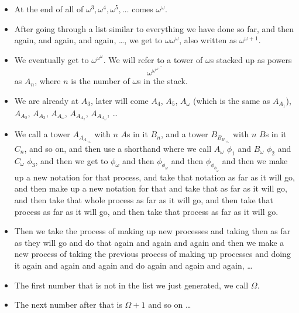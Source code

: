 \begin{itemize}
\item
At the end of all of $\omega^3, \omega^4, \omega^5, \ldots$ comes $\omega^{\omega}$.
\item
After going through a list similar to everything we have done so far, and then again, and again, and again, \ldots, we get to $\omega \omega^{\omega}$, also written as $\omega^{\omega + 1}$.
\item
We eventually get to $\omega^{\omega^\omega}$. We will refer to a tower of $\omega$s stacked up as powers 
\[ \omega^{\omega^{\omega^{\ldots^{\omega}}}} \]
as $A_n$, where $n$ is the number of $\omega$s in the stack.
\item
We are already at $A_3$, later will come $A_4$, $A_5$, $A_{\omega}$ (which is the same as $A_{A_1}$), $A_{A_2}$, $A_{A_3}$, $A_{A_\omega}$, $A_{A_{A_2}}$, $A_{A_{A_\omega}}$, \ldots
\item
We call a tower $A_{A_{A_{\ddots_{A_\omega}}}}$ with $n$ $A$s in it $B_n$, and a tower $B_{B_{B_{\ddots_{B_\omega}}}}$ with $n$ $B$s in it $C_n$, and so on, and then use a shorthand where we call $A_\omega$ $\phi_1$ and $B_\omega$ $\phi_2$ and $C_\omega$ $\phi_3$, and then we get to $\phi_\omega$ and then $\phi_{\phi_\omega}$ and then $\phi_{\phi_{\phi_\omega}}$ and then we make up a new notation for that process, and take that notation as far as it will go, and then make up a new notation for that and take that as far as it will go, and then take that whole process as far as it will go, and then take that process as far as it will go, and then take that process as far as it will go.
\item
Then we take the process of making up new processes and taking then as far as they will go and do that again and again and again and then we make a new process of taking the previous process of making up processes and doing it again and again and again and do  again and again and again, \ldots
\item
The first number that is not in the list we just generated, we call $\Omega$.
\item
The next number after that is $\Omega + 1$ and so on \ldots
\end{itemize}  
